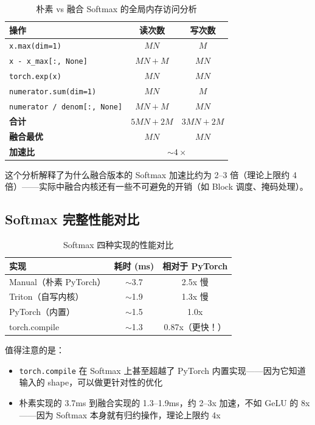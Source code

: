 \documentclass[a4paper]{article}
\begin{document}
\begin{table}[H]
\centering
\begin{tabular}{lcc}
\toprule
\textbf{操作} & \textbf{读次数} & \textbf{写次数} \\
\midrule
\texttt{x.max(dim=1)} & $MN$ & $M$ \\
\texttt{x - x\_max[:, None]} & $MN + M$ & $MN$ \\
\texttt{torch.exp(x)} & $MN$ & $MN$ \\
\texttt{numerator.sum(dim=1)} & $MN$ & $M$ \\
\texttt{numerator / denom[:, None]} & $MN + M$ & $MN$ \\
\midrule
\textbf{合计} & $5MN + 2M$ & $3MN + 2M$ \\
\textbf{融合最优} & $MN$ & $MN$ \\
\textbf{加速比} & \multicolumn{2}{c}{$\sim 4\times$} \\
\bottomrule
\end{tabular}
\caption{朴素 vs 融合 Softmax 的全局内存访问分析}
\end{table}

这个分析解释了为什么融合版本的 Softmax 加速比约为 2--3 倍（理论上限约 4 倍）——实际中融合内核还有一些不可避免的开销（如 Block 调度、掩码处理）。

\subsection{Softmax 完整性能对比}

\begin{table}[H]
\centering
\begin{tabular}{lcc}
\toprule
\textbf{实现} & \textbf{耗时 (ms)} & \textbf{相对于 PyTorch} \\
\midrule
Manual（朴素 PyTorch） & $\sim$3.7 & 2.5x 慢 \\
Triton（自写内核） & $\sim$1.9 & 1.3x 慢 \\
PyTorch（内置） & $\sim$1.5 & 1.0x \\
torch.compile & $\sim$1.3 & 0.87x（更快！）\\
\bottomrule
\end{tabular}
\caption{Softmax 四种实现的性能对比}
\end{table}

值得注意的是：
\begin{itemize}
    \item \texttt{torch.compile} 在 Softmax 上甚至超越了 PyTorch 内置实现——因为它知道输入的 shape，可以做更针对性的优化
    \item 朴素实现的 3.7ms 到融合实现的 1.3--1.9ms，约 2--3x 加速，不如 GeLU 的 8x——因为 Softmax 本身就有归约操作，理论上限约 4x
\end{itemize}
\end{document}
